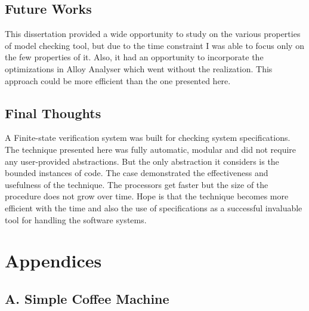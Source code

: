 \documentclass[a4paper,12pt]{report}
\begin{document}
\section{Future Works}
\label{Future works}
This dissertation provided a wide opportunity to study on the various properties of model checking tool, but due to the time constraint I was able to focus only on the few properties of it. Also, it had an opportunity to incorporate the optimizations in Alloy Analyser which went without the realization. This approach could be more efficient than the one presented here. 

\section{Final Thoughts} 
\label{Final Thoughts} 
A Finite-state verification system was built for checking system specifications. The technique presented here was fully automatic, modular and did not require any user-provided abstractions. But the only abstraction it considers is the bounded instances of code. The case demonstrated the effectiveness and  usefulness of the technique. The processors get faster but the size of the procedure does not grow over time. Hope is that the technique becomes more efficient with the time and also the use of specifications as a successful invaluable tool for handling the software systems. 





\chapter{Appendices}
\label{Appendices}
\section{A. Simple Coffee Machine}
\end{document}
